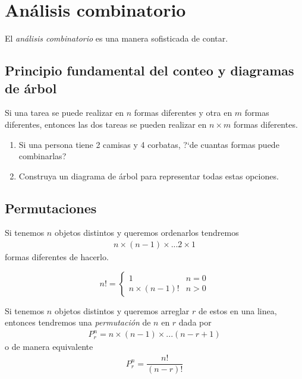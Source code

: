\section{Análisis combinatorio}

{}
El \emph{análisis combinatorio} es una manera sofisticada de contar.


\subsection{Principio fundamental del conteo y diagramas de árbol}

Si una tarea se puede realizar en $n$ formas diferentes y otra en $m$ formas diferentes, entonces las dos tareas se pueden realizar en $n\times m$ formas diferentes.


{}
\begin{ejemplo}
	\label{exmp:1.14}
\end{ejemplo}
\begin{enumerate}
	\item Si una persona tiene 2 camisas y 4 corbatas, ?`de cuantas formas puede combinarlas?
	\item Construya un diagrama de árbol para representar todas estas opciones.
\end{enumerate}



\subsection{Permutaciones}
{}
Si tenemos $n$ objetos distintos y queremos ordenarlos tendremos
\begin{align*}
	n \times (n-1) \times ... 2\times 1
\end{align*} formas diferentes de hacerlo.

{}
\begin{defn}[$n$ factorial]
	\begin{equation}
		n! = \begin{cases}
			1 & n=0 \\
			n\times(n-1)! & n>0
		\end{cases}
	\end{equation}
	
\end{defn}


{}
Si tenemos $n$ objetos distintos y queremos arreglar $r$ de estos en una linea, entonces tendremos una \emph{permutación} de $n$ en $r$ dada por
\begin{align}
	\label{1.25}
	P^{n}_{r}=n\times(n-1)\times...\left( n-r+1 \right)
\end{align} 
o de manera equivalente
\begin{align}
	\label{1.27}
	P^{n}_{r}=\dfrac{n!}{(n-r)!}
\end{align}


